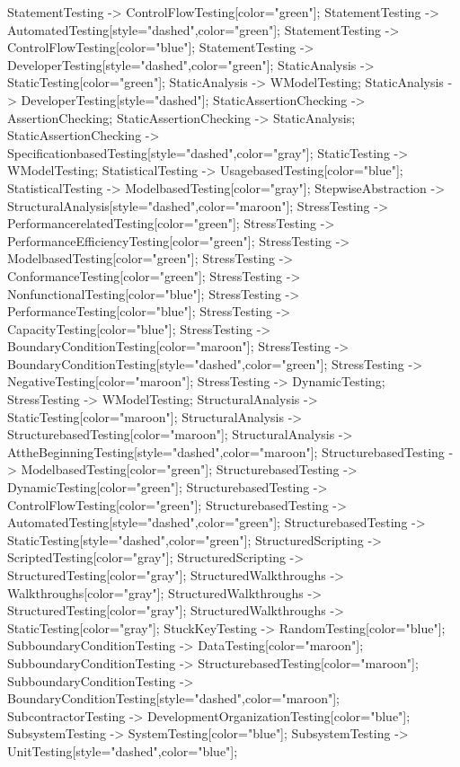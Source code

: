 \documentclass{article}
\begin{document}
{StatementTesting -> ControlFlowTesting[color="green"];
StatementTesting -> AutomatedTesting[style="dashed",color="green"];
StatementTesting -> ControlFlowTesting[color="blue"];
StatementTesting -> DeveloperTesting[style="dashed",color="green"];
StaticAnalysis -> StaticTesting[color="green"];
StaticAnalysis -> WModelTesting;
StaticAnalysis -> DeveloperTesting[style="dashed"];
StaticAssertionChecking -> AssertionChecking;
StaticAssertionChecking -> StaticAnalysis;
StaticAssertionChecking -> SpecificationbasedTesting[style="dashed",color="gray"];
StaticTesting -> WModelTesting;
StatisticalTesting -> UsagebasedTesting[color="blue"];
StatisticalTesting -> ModelbasedTesting[color="gray"];
StepwiseAbstraction -> StructuralAnalysis[style="dashed",color="maroon"];
StressTesting -> PerformancerelatedTesting[color="green"];
StressTesting -> PerformanceEfficiencyTesting[color="green"];
StressTesting -> ModelbasedTesting[color="green"];
StressTesting -> ConformanceTesting[color="green"];
StressTesting -> NonfunctionalTesting[color="blue"];
StressTesting -> PerformanceTesting[color="blue"];
StressTesting -> CapacityTesting[color="blue"];
StressTesting -> BoundaryConditionTesting[color="maroon"];
StressTesting -> BoundaryConditionTesting[style="dashed",color="green"];
StressTesting -> NegativeTesting[color="maroon"];
StressTesting -> DynamicTesting;
StressTesting -> WModelTesting;
StructuralAnalysis -> StaticTesting[color="maroon"];
StructuralAnalysis -> StructurebasedTesting[color="maroon"];
StructuralAnalysis -> AttheBeginningTesting[style="dashed",color="maroon"];
StructurebasedTesting -> ModelbasedTesting[color="green"];
StructurebasedTesting -> DynamicTesting[color="green"];
StructurebasedTesting -> ControlFlowTesting[color="green"];
StructurebasedTesting -> AutomatedTesting[style="dashed",color="green"];
StructurebasedTesting -> StaticTesting[style="dashed",color="green"];
StructuredScripting -> ScriptedTesting[color="gray"];
StructuredScripting -> StructuredTesting[color="gray"];
StructuredWalkthroughs -> Walkthroughs[color="gray"];
StructuredWalkthroughs -> StructuredTesting[color="gray"];
StructuredWalkthroughs -> StaticTesting[color="gray"];
StuckKeyTesting -> RandomTesting[color="blue"];
SubboundaryConditionTesting -> DataTesting[color="maroon"];
SubboundaryConditionTesting -> StructurebasedTesting[color="maroon"];
SubboundaryConditionTesting -> BoundaryConditionTesting[style="dashed",color="maroon"];
SubcontractorTesting -> DevelopmentOrganizationTesting[color="blue"];
SubsystemTesting -> SystemTesting[color="blue"];
SubsystemTesting -> UnitTesting[style="dashed",color="blue"];
}
\end{document}
